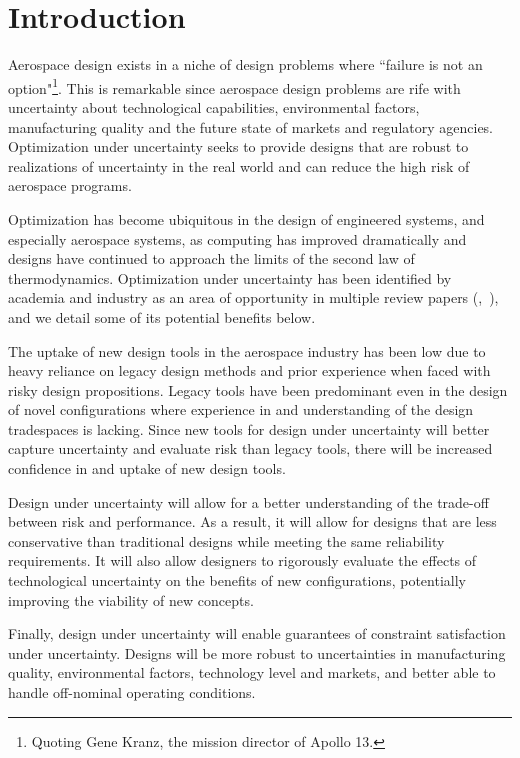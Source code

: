 \section{Introduction}

Aerospace design exists in a niche of design problems where ``failure is
not an option"\footnote{Quoting Gene Kranz, the mission director of Apollo 13.}.
This is remarkable since aerospace design problems are rife with uncertainty about
technological capabilities, environmental factors, manufacturing quality and the future
state of markets and regulatory agencies.
Optimization under uncertainty seeks to provide designs that are robust
to realizations of uncertainty in the real world and can reduce
the high risk of aerospace programs.

Optimization has become ubiquitous in the design of engineered systems, and especially aerospace systems,
as computing has improved dramatically and designs have
continued to approach the limits of the second law of thermodynamics. Optimization under uncertainty
has been identified by academia and industry as an area of opportunity
in multiple review papers (\cite{Zang2002},~\cite{Yao2011}),
and we detail some of its potential benefits below.

{\color{blue} The uptake of new design tools in the aerospace industry has been low
due to heavy reliance on legacy design methods and prior experience when
faced with risky design propositions. Legacy tools
have been predominant even in the design of novel configurations where experience in
and understanding of the design tradespaces is lacking. Since new tools for design under uncertainty
will better capture uncertainty and evaluate risk than legacy tools,
there will be increased confidence in and uptake of new design tools.

Design under uncertainty will allow for a better understanding of the trade-off between risk and
performance. As a result, it will allow for designs that are less conservative than
traditional designs while meeting the same reliability requirements. It will also allow
designers to rigorously evaluate the effects of
technological uncertainty on the benefits of new configurations,
potentially improving the viability of new concepts.

Finally, design under uncertainty will enable guarantees
of constraint satisfaction under uncertainty. Designs
will be more robust to uncertainties in manufacturing quality,
environmental factors, technology level and markets, and better able to
handle off-nominal operating conditions.}

